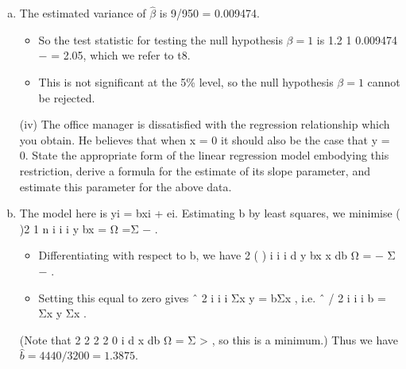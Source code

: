 \documentclass[a4paper,12pt]{article}
\begin{document}
\begin{enumerate}[(a)]
\begin{framed}
(iii) Given that the variance of the slope estimate is Σ( − )2
2
x x i
σ , where x denotes
the sample mean benchmark time, test at the 5%
hypothesis that the slope of this regression is 1.
(4)

\end{framed}
\item  The estimated variance of $\hat{\beta}$ is 9/950 = 0.009474. 
\begin{itemize}
    \item So the test statistic for
testing the null hypothesis $\beta = 1$ is 1.2 1
0.009474
− = 2.05, which we refer to t8.
\item This is not significant at the 5\% level, so the null hypothesis $\beta = 1$ cannot be rejected.
\end{itemize}
\newpage
\begin{framed}
(iv) The office manager is dissatisfied with the regression relationship which you
obtain. He believes that when x = 0 it should also be the case that y = 0. State
the appropriate form of the linear regression model embodying this restriction,
derive a formula for the estimate of its slope parameter, and estimate this
parameter for the above data.
\end{framed}
\item  The model here is yi = bxi + ei.
Estimating b by least squares, we minimise ( )2
1
n
i i
i
y bx
=
Ω =Σ − .
\begin{itemize}
    \item Differentiating with respect to b, we have 2 ( ) i i i
d y bx x
db
Ω = − Σ − .
\item Setting this equal to zero gives ˆ 2
i i i Σx y = bΣx , i.e. ˆ / 2 i i i b = Σx y Σx .
\end{itemize}

(Note that
2
2
2 2 0 i
d x
db
Ω = Σ > , so this is a minimum.)
Thus we have $\hat{b} = 4440/3200 = 1.3875$.
\end{enumerate}
\end{document}
